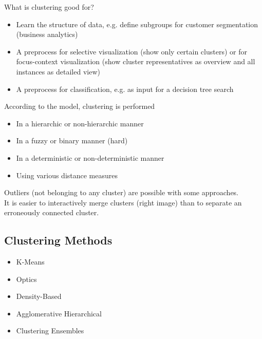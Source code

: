\documentclass[11pt,ngerman]{article}
\begin{document}
What is clustering good for?
\begin{itemize}
\item Learn the structure of data, e.g. define subgroups for
customer segmentation (business analytics)
\item A preprocess for selective visualization (show only
certain clusters) or for focus-context visualization
(show cluster representatives as overview and all
instances as detailed view)
\item A preprocess for classification, e.g. as input for a
decision tree search
\end{itemize}

According to the model, clustering is performed
\begin{itemize}
\item In a hierarchic or non-hierarchic manner
\item In a fuzzy or binary manner (hard)
\item In a deterministic or non-deterministic manner
\item Using various distance measures
\end{itemize}
Outliers (not belonging to any cluster) are possible with
some approaches.\\
It is easier to interactively merge clusters (right image) than to
separate an erroneously connected cluster.

\subsection{Clustering Methods}
\begin{itemize}
	\item K-Means
\item Optics
\item Density-Based
\item Agglomerative Hierarchical
\item Clustering Ensembles
\end{itemize}
\end{document}
